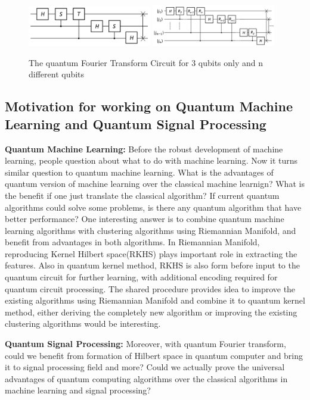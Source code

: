 \documentclass{article}
\begin{document}
\begin{figure}[h]
  \includegraphics[width=0.48\textwidth]{qft2.png}
  \includegraphics[width=0.48\textwidth]{qft1.png}
  \caption{The quantum Fourier Transform Circuit for 3 qubits only and 
  n different qubits}
\end{figure}

 
\subsection{Motivation for working on Quantum Machine Learning and Quantum Signal Processing}

\textbf{Quantum Machine Learning:}  Before the robust 
development of machine learning, people question about 
what to do with machine learning. Now it turns similar 
question to quantum machine learning. What is the advantages of 
quantum version of machine learning over the classical 
machine learnign? What is the benefit if one just translate
the classical algorithm? If current quantum algorithms could 
solve some problems, is there any quantum algorithm that have 
better performance?
One interesting answer is to 
combine quantum machine learning algorithms with clustering 
algorithms using Riemannian Manifold, and benefit from 
advantages in both algorithms. In Riemannian Manifold, 
reproducing Kernel Hilbert space(RKHS)
plays important role in extracting the 
features. Also in quantum kernel method, RKHS is also 
form before input to the quantum circuit for further learning, 
with additional encoding required for quantum circuit processing. 
The shared procedure provides idea to improve the existing 
algorithms using Riemannian Manifold and combine it to 
quantum kernel method, either deriving the completely new algorithm or 
improving the existing clustering algorithms would be interesting. 
\cite{qml_kernel} \cite{qml_ibm} \cite{qml_ibm2}

\textbf{Quantum Signal Processing:} 
Moreover, with quantum Fourier transform, could we benefit from 
formation of Hilbert space in quantum computer and bring it to 
signal processing field and more? Could we actually prove the 
universal advantages of quantum computing algorithms over the 
classical algorithms in machine learning and signal processing? 
\end{document}
